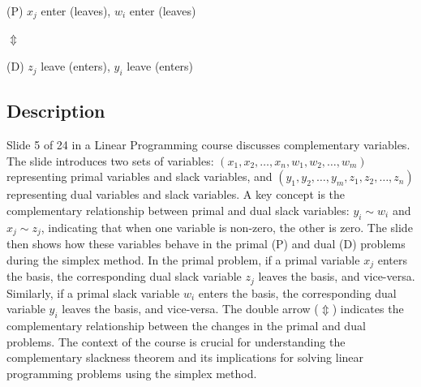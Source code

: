\documentclass{article}%
\begin{document}
(P) \quad $x_j$ enter (leaves), $w_i$ enter (leaves)

$\Updownarrow$

(D) \quad $z_j$ leave (enters), $y_i$ leave (enters)
%
\subsection{Description}%
Slide 5 of 24 in a Linear Programming course discusses complementary variables. The slide introduces two sets of variables: $(x_1, x_2, \dots, x_n, w_1, w_2, \dots, w_m)$ representing primal variables and slack variables, and $(y_1, y_2, \dots, y_m, z_1, z_2, \dots, z_n)$ representing dual variables and slack variables.  A key concept is the complementary relationship between primal and dual slack variables: $y_i \sim w_i$ and $x_j \sim z_j$, indicating that when one variable is non-zero, the other is zero. The slide then shows how these variables behave in the primal (P) and dual (D) problems during the simplex method. In the primal problem, if a primal variable $x_j$ enters the basis, the corresponding dual slack variable $z_j$ leaves the basis, and vice-versa. Similarly, if a primal slack variable $w_i$ enters the basis, the corresponding dual variable $y_i$ leaves the basis, and vice-versa. The double arrow ($\Updownarrow$) indicates the complementary relationship between the changes in the primal and dual problems. The context of the course is crucial for understanding the complementary slackness theorem and its implications for solving linear programming problems using the simplex method.%
\end{document}
